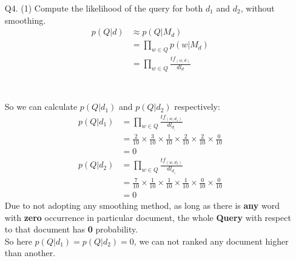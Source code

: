 \documentclass[12pt, letterpaper, twoside]{article}
\begin{document}
\begin{enumerate}
    \item[Q4.]
        (1) Compute the likelihood of the query for both $d_1$ and $d_2$, without smoothing.\\
        \begin{equation}
        \begin{split}
            p(Q|d) & \approx p(Q|M_d) \\
            & = \prod_{w \in Q}^{} p(w|M_d)\\
            & = \prod_{w \in Q}^{} \frac{tf_{(w,d)}}{dl_d}\\
        \end{split}
        \end{equation}\\
        \\
        So we can calculate $p(Q|d_1)$ and $p(Q|d_2)$ respectively:
        \begin{equation}
        \begin{split}
            p(Q|d_1) & = \prod_{w \in Q}^{} \frac{tf_{(w,d_1)}}{{dl_d__1}}\\
            & = \frac{2}{10}\times\frac{3}{10}\times\frac{1}{10}\times\frac{2}{10}\times\frac{2}{10}\times \frac{0}{10}\\
            & = 0
        \end{split}
        \end{equation}
        \begin{equation}
        \begin{split}
            p(Q|d_2) & = \prod_{w \in Q}^{} \frac{tf_{(w,d_2)}}{{dl_d__2}}\\
            & = \frac{7}{10}\times\frac{1}{10}\times\frac{1}{10}\times\frac{1}{10}\times \frac{0}{10}\times \frac{0}{10}\\
            & = 0
        \end{split}
        \end{equation}
        Due to not adopting any smoothing method, as long as there is \textbf{any} word with \textbf{zero} occurrence in particular document, the whole \textbf{Query} with respect to that document has \textbf{0} probability.\\
        So here $p(Q|d_1) = p(Q|d_2) = 0$, we can not ranked any document higher than another.\\


\end{enumerate}
\end{document}

